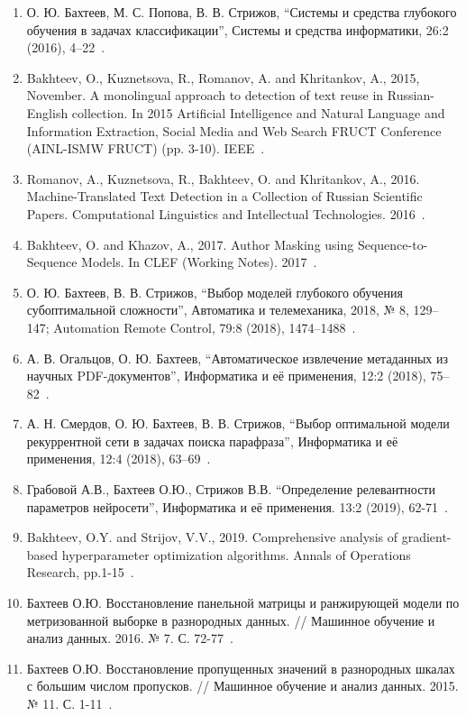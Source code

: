 \begin{enumerate}
\item О. Ю. Бахтеев, М. С. Попова, В. В. Стрижов, “Системы и средства глубокого обучения в задачах классификации”, Системы и средства информатики, 26:2 (2016), 4–22~\cite{popova2}.
\item Bakhteev, O., Kuznetsova, R., Romanov, A. and Khritankov, A., 2015, November. A monolingual approach to detection of text reuse in Russian-English collection. In 2015 Artificial Intelligence and Natural Language and Information Extraction, Social Media and Web Search FRUCT Conference (AINL-ISMW FRUCT) (pp. 3-10). IEEE~\cite{monolingual}.
\item Romanov, A., Kuznetsova, R., Bakhteev, O. and Khritankov, A., 2016. Machine-Translated Text Detection in a Collection of Russian Scientific Papers. Computational Linguistics and Intellectual Technologies. 2016~\cite{dialog}. 
\item Bakhteev, O. and Khazov, A., 2017. Author Masking using Sequence-to-Sequence Models. In CLEF (Working Notes). 2017~\cite{pan_s2s}.
\item О. Ю. Бахтеев, В. В. Стрижов, “Выбор моделей глубокого обучения субоптимальной сложности”, Автоматика и телемеханика, 2018, № 8, 129–147; Automation Remote Control, 79:8 (2018), 1474–1488~\cite{var_ait}.
\item А. В. Огальцов, О. Ю. Бахтеев, “Автоматическое извлечение метаданных из научных PDF-документов”, Информатика и её применения, 12:2 (2018), 75–82~\cite{ogaltsov}.
\item А. Н. Смердов, О. Ю. Бахтеев, В. В. Стрижов, “Выбор оптимальной модели рекуррентной сети в задачах поиска парафраза”, Информатика и её применения, 12:4 (2018), 63–69~\cite{smerdov}.
\item Грабовой А.В., Бахтеев О.Ю., Стрижов В.В. “Определение релевантности параметров нейросети”, Информатика и её применения. 13:2 (2019), 62-71~\cite{grabovoy}.
\item Bakhteev, O.Y. and Strijov, V.V., 2019. Comprehensive analysis of gradient-based hyperparameter optimization algorithms. Annals of Operations Research, pp.1-15~\cite{hyper_bakhteev}.


\item Бахтеев О.Ю. Восстановление панельной матрицы и ранжирующей модели по метризованной выборке в разнородных данных. // Машинное обучение и анализ данных. 2016. № 7. С. 72-77~\cite{panel}.
\item Бахтеев О.Ю. Восстановление пропущенных значений в разнородных шкалах с большим числом пропусков. // Машинное обучение и анализ данных. 2015. № 11. С. 1-11~\cite{knn}.

\end{enumerate}


